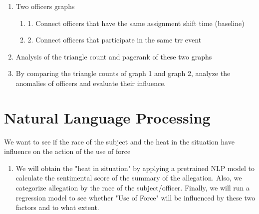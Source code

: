 \documentclass[10pt]{article}
\begin{document}
\begin{enumerate}

\item Two officers graphs
    \begin{enumerate}
    \item 1. Connect officers that have the same assignment shift time (baseline)
    \item 2. Connect officers that participate in the same trr event
    \end{enumerate}
\item Analysis of the triangle count and pagerank of these two graphs

\item By comparing the triangle counts of graph 1 and graph 2, analyze the anomalies of officers and evaluate their influence.

\end{enumerate}



\section{Natural Language Processing}

We want to see if the race of the subject and the heat in the situation have influence on the action of the use of force

\begin{enumerate}

\item We will obtain the "heat in situation" by applying a pretrained NLP model to calculate the sentimental score of the summary of the allegation. Also, we categorize allegation by the race of the subject/officer. Finally, we will run a regression model to see whether "Use of Force" will be influenced by these two factors and to what extent.

\end{enumerate}
\end{document}
